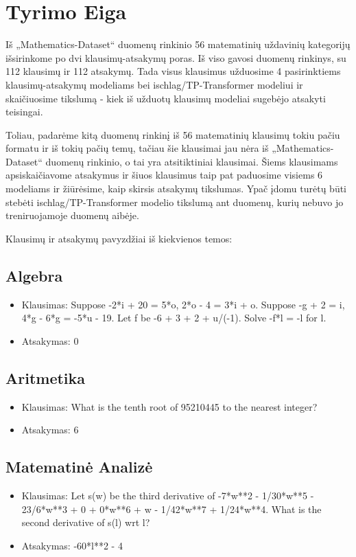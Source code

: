 \documentclass[conference]{IEEEtran}
\begin{document}
\section{Tyrimo Eiga}
Iš „Mathematics-Dataset“ duomenų rinkinio 56 matematinių uždavinių kategorijų išsirinkome
po dvi klausimų-atsakymų poras. Iš viso gavosi duomenų rinkinys, su 112 klausimų ir 112 atsakymų.
Tada visus klausimus užduosime 4 pasirinktiems klausimų-atsakymų modeliams bei ischlag/TP-Transformer modeliui ir skaičiuosime
tikslumą - kiek iš užduotų klausimų modeliai sugebėjo atsakyti teisingai. \par
Toliau, padarėme kitą duomenų rinkinį iš 56 matematinių klausimų tokiu pačiu formatu ir iš tokių pačių temų,
tačiau šie klausimai jau nėra iš „Mathematics-Dataset“ duomenų rinkinio, o tai yra
atsitiktiniai klausimai. Šiems klausimams apsiskaičiavome atsakymus ir šiuos klausimus taip pat paduosime
visiems 6 modeliams ir žiūrėsime, kaip skirsis atsakymų tikslumas. Ypač įdomu turėtų būti stebėti
ischlag/TP-Transformer modelio tikslumą ant duomenų, kurių nebuvo jo treniruojamoje duomenų aibėje. \par
Klausimų ir atsakymų pavyzdžiai iš kiekvienos temos:
\subsection{Algebra}
\begin{itemize}
    \item Klausimas: Suppose -2*i + 20 = 5*o, 2*o - 4 = 3*i + o. Suppose -g + 2 = i, 4*g - 6*g = -5*u - 19. Let f be -6 + 3 + 2 + u/(-1). Solve -f*l = -l for l.
    \item Atsakymas: 0
\end{itemize}
\subsection{Aritmetika}
\begin{itemize}
    \item Klausimas: What is the tenth root of 95210445 to the nearest integer?
    \item Atsakymas: 6
\end{itemize}
\subsection{Matematinė Analizė}
\begin{itemize}
    \item Klausimas: Let s(w) be the third derivative of -7*w**2 - 1/30*w**5 - 23/6*w**3 + 0 + 0*w**6 + w - 1/42*w**7 + 1/24*w**4. What is the second derivative of s(l) wrt l?
    \item Atsakymas: -60*l**2 - 4
\end{itemize}
\end{document}
